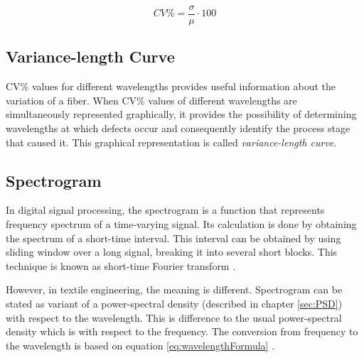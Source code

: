 \documentclass[twoside]{ctuthesis}
\theoremstyle{plain}
\theoremstyle{definition}
\theoremstyle{note}
\begin{document}
\begin{equation} \label{eq:CVCalculationIntroduction}
 CV\% = \frac{\sigma}{\mu} \cdot 100
\end{equation}

\subsection{Variance-length Curve}
\label{sec:VarianceL_curve}
CV\% values for different wavelengths provides useful information about the variation of a fiber. When CV\% values of different wavelengths are simultaneously represented graphically, it provides the possibility of determining wavelengths at which defects occur and consequently identify the process stage that caused it. This graphical representation is called \textit{variance-length curve}.

\subsection{Spectrogram}
\label{SpecExplained}
In digital signal processing, the spectrogram is a function that represents frequency spectrum of a time-varying signal. Its calculation is done by obtaining the spectrum of a short-time interval. This interval can be obtained by using sliding window over a long signal, breaking it into several short blocks. This technique is known as short-time Fourier transform \cite{cite:RT_DSP}. 

However, in textile engineering, the meaning is different. Spectrogram can be stated as variant of a power-spectral density (described in chapter \ref{sec:PSD}) with respect to the wavelength. This is difference to the usual power-spectral density which is with respect to the frequency. The conversion from frequency to the wavelength is based on equation \ref{eq:wavelengthFormula} \cite{cite:paperKorobov_Jun}.
\end{document}
